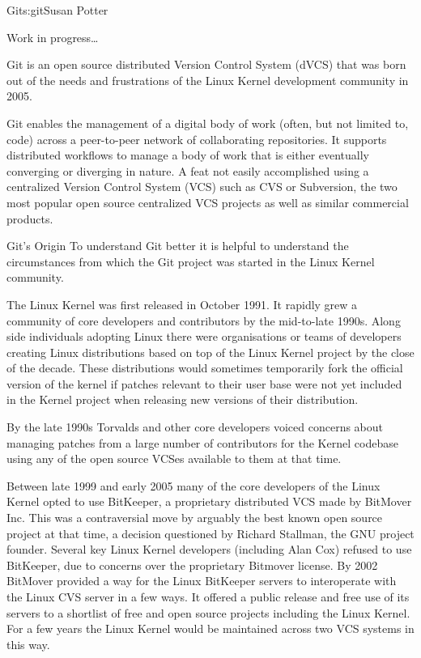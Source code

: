 \begin{aosachapter}{Git}{s:git}{Susan Potter}

Work in progress\ldots

Git is an open source distributed Version Control System (dVCS) that was
born out of the needs and frustrations of the Linux Kernel development
community in 2005.

Git enables the management of a digital body of work (often,
but not limited to, code) across a peer-to-peer network of
collaborating repositories. It supports distributed workflows to
manage a body of work that is either eventually converging or
diverging in nature. A feat not easily accomplished
using a centralized Version Control System (VCS) such as CVS or
Subversion, the two most popular open source centralized VCS
projects as well as similar commercial products.

\begin{aosasect1}{Git's Origin}
To understand Git better it is helpful to understand the circumstances
from which the Git project was started in the Linux Kernel community.

The Linux Kernel was first released in October 1991. It rapidly grew a
community of core developers and contributors by the mid-to-late 1990s. Along
side individuals adopting Linux there were organisations or teams of
developers creating Linux distributions based on top of the Linux Kernel
project by the close of the decade. These distributions would sometimes
temporarily fork the official version of the kernel if patches relevant to
their user base were not yet included in the Kernel project when releasing
new versions of their distribution.

By the late 1990s Torvalds and other core developers voiced concerns
about managing patches from a large number of contributors for the
Kernel codebase using any of the open source VCSes available to them at
that time.

Between late 1999 and early 2005 many of the core developers of the Linux
Kernel opted to use BitKeeper, a proprietary distributed VCS made by
BitMover Inc. This was a contraversial move by arguably the best known open
source project at that time, a decision questioned by Richard Stallman, the
GNU project founder. Several key Linux Kernel developers (including Alan Cox)
refused to use BitKeeper, due to concerns over the proprietary Bitmover
license. By 2002 BitMover provided a way for the Linux BitKeeper servers to
interoperate with the Linux CVS server in a few ways. It offered a
public release and free use of its servers to a shortlist of free and
open source projects including the Linux Kernel. For a few years the
Linux Kernel would be maintained across two VCS systems in this way.


\end{aosasect1}
\end{aosachapter}
